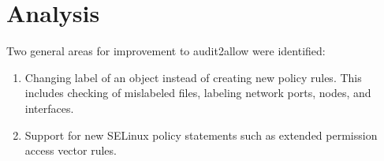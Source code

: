 
\chapter{Analysis}
Two general areas for improvement to audit2allow were identified:
\begin{enumerate}
    \item Changing label of an object instead of creating new policy rules. This
        includes checking of mislabeled files, labeling network ports, nodes,
        and interfaces.
    \item Support for new SELinux policy statements such as extended permission
        access vector rules.
\end{enumerate}

